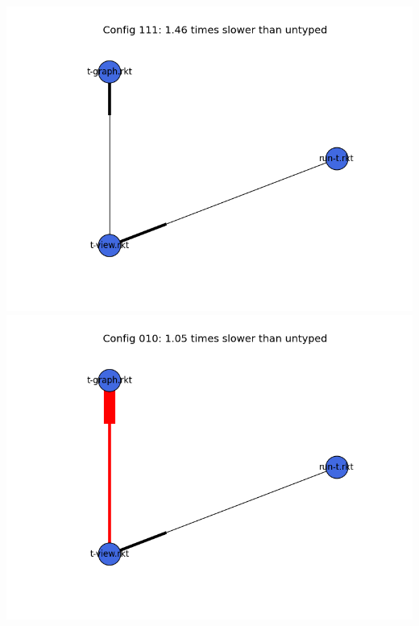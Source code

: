 \documentclass{article}
\begin{document}
\begin{itemize}
\includegraphics[width=\textwidth]{mbta-stressfree-module-graph-111.png}
\includegraphics[width=\textwidth]{mbta-stressfree-module-graph-010.png}
\end{itemize}
\end{document}
